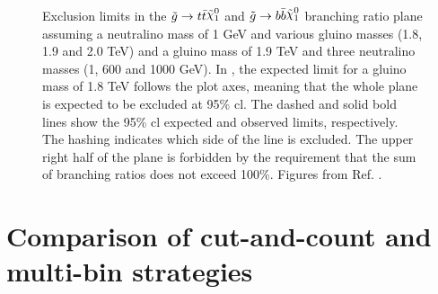 \begin{figure}[htbp]
	\centering
	\caption{Exclusion limits in the $\gluino \to t \bar{t} \ninoone$ and $\gluino \to b \bar{b} \ninoone$
		branching ratio plane assuming  a neutralino mass of 1 GeV and various gluino masses 
		(1.8, 1.9 and 2.0 TeV) and  a gluino mass of 1.9 TeV and three neutralino masses (1, 600 and 1000 GeV). 
		In , the expected limit for a gluino mass of 1.8 TeV follows the plot axes, meaning that the whole plane is 
		expected to be excluded at 95\% \gls{cl}.
		The dashed and solid bold lines show the 95\% \gls{cl} expected and observed limits, respectively. The hashing indicates which side of the line 
		is excluded. The upper right half of the plane is forbidden by the requirement that the sum of branching ratios does not exceed 100\%.
		    Figures from Ref. \cite{Aaboud:2017hrg}.}
\end{figure}

\FloatBarrier

\section{Comparison of cut-and-count and multi-bin strategies}

